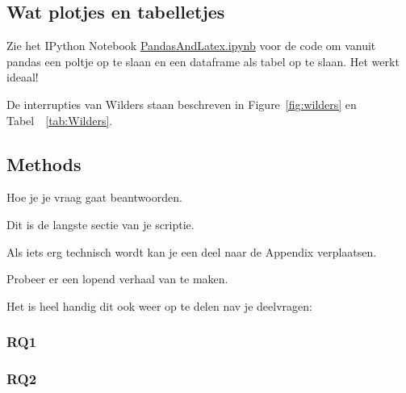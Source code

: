 \pagebreak
\subsection{Wat plotjes en tabelletjes}

Zie het IPython Notebook \url{PandasAndLatex.ipynb} voor de code om vanuit pandas een poltje op te slaan en een dataframe als tabel op te slaan. Het werkt ideaal! 

De interrupties van Wilders staan beschreven in Figure~\ref{fig:wilders} en Tabel~~\ref{tab:Wilders}.




\pagebreak



\pagebreak
\subsection{Methods}
Hoe je je vraag gaat beantwoorden.


Dit is de langste sectie van je scriptie. 

Als iets erg technisch wordt kan je een deel naar de Appendix verplaatsen. 

Probeer er een lopend verhaal van te maken.

Het is heel handig dit ook weer op te delen nav je deelvragen:

\subsubsection{RQ1}

\subsubsection{RQ2}
